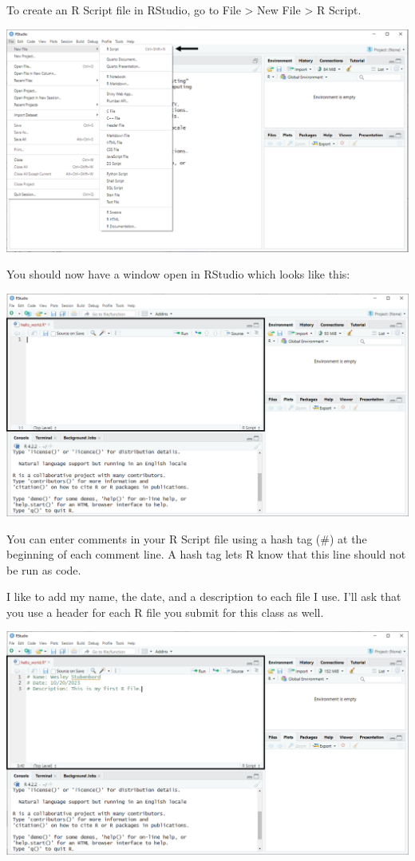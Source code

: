 \documentclass[
]{book}
\begin{document}
To create an R Script file in RStudio, go to File \textgreater{} New File \textgreater{} R Script.

\includegraphics{docs/_main_files/figure-html/RStudio_Opening an R Script File.png}

You should now have a window open in RStudio which looks like this:

\includegraphics{docs/_main_files/figure-html/RStudio_Opened RScript.png}

You can enter comments in your R Script file using a hash tag (\#) at the beginning of each comment line. A hash tag lets R know that this line should not be run as code.

I like to add my name, the date, and a description to each file I use. I'll ask that you use a header for each R file you submit for this class as well.

\includegraphics{docs/_main_files/figure-html/RStudio_Commenting in an R Script file.png}
\end{document}
